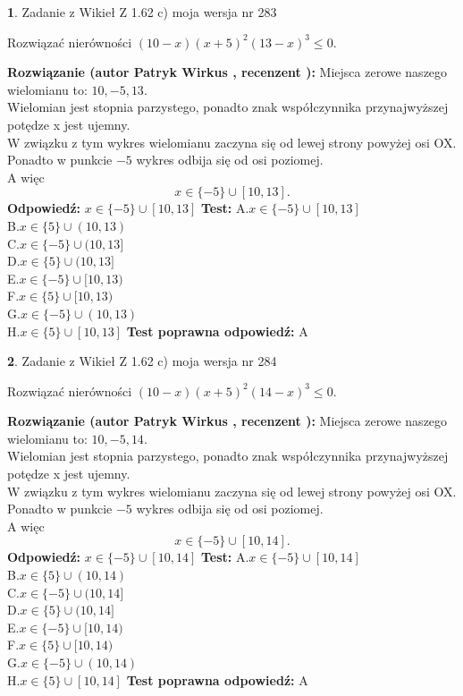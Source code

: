 \documentclass[12pt, a4paper]{article}
\theoremstyle{definition} %
\newtheorem{zad}{}
\newcommand{\zadStart}[1]{\begin{zad}#1\newline}
\newcommand{\zadStop}{\end{zad}}
\newcommand{\rozwStart}[2]{\noindent \textbf{Rozwiązanie (autor #1 , recenzent #2): }\newline}
\newcommand{\rozwStop}{\newline}
\newcommand{\odpStart}{\noindent \textbf{Odpowiedź:}\newline}
\newcommand{\odpStop}{\newline}
\newcommand{\testStart}{\noindent \textbf{Test:}\newline}
\newcommand{\testStop}{\newline}
\newcommand{\kluczStart}{\noindent \textbf{Test poprawna odpowiedź:}\newline}
\newcommand{\kluczStop}{\newline}
\begin{document}
\zadStart{Zadanie z Wikieł Z 1.62 c) moja wersja nr 283}

Rozwiązać nierówności $(10-x)(x+5)^{2}(13-x)^{3}\le0$.
\zadStop
\rozwStart{Patryk Wirkus}{}
Miejsca zerowe naszego wielomianu to: $10, -5, 13$.\\
Wielomian jest stopnia parzystego, ponadto znak współczynnika przy\linebreak najwyższej potędze x jest ujemny.\\ W związku z tym wykres wielomianu zaczyna się od lewej strony powyżej osi OX.\\
Ponadto w punkcie $-5$ wykres odbija się od osi poziomej.\\
A więc $$x \in \{-5\} \cup [10,13].$$
\rozwStop
\odpStart
$x \in \{-5\} \cup [10,13]$
\odpStop
\testStart
A.$x \in \{-5\} \cup [10,13]$\\
B.$x \in \{5\} \cup (10,13)$\\
C.$x \in \{-5\} \cup (10,13]$\\
D.$x \in \{5\} \cup (10,13]$\\
E.$x \in \{-5\} \cup [10,13)$\\
F.$x \in \{5\} \cup [10,13)$\\
G.$x \in \{-5\} \cup (10,13)$\\
H.$x \in \{5\} \cup [10,13]$
\testStop
\kluczStart
A
\kluczStop



\zadStart{Zadanie z Wikieł Z 1.62 c) moja wersja nr 284}

Rozwiązać nierówności $(10-x)(x+5)^{2}(14-x)^{3}\le0$.
\zadStop
\rozwStart{Patryk Wirkus}{}
Miejsca zerowe naszego wielomianu to: $10, -5, 14$.\\
Wielomian jest stopnia parzystego, ponadto znak współczynnika przy\linebreak najwyższej potędze x jest ujemny.\\ W związku z tym wykres wielomianu zaczyna się od lewej strony powyżej osi OX.\\
Ponadto w punkcie $-5$ wykres odbija się od osi poziomej.\\
A więc $$x \in \{-5\} \cup [10,14].$$
\rozwStop
\odpStart
$x \in \{-5\} \cup [10,14]$
\odpStop
\testStart
A.$x \in \{-5\} \cup [10,14]$\\
B.$x \in \{5\} \cup (10,14)$\\
C.$x \in \{-5\} \cup (10,14]$\\
D.$x \in \{5\} \cup (10,14]$\\
E.$x \in \{-5\} \cup [10,14)$\\
F.$x \in \{5\} \cup [10,14)$\\
G.$x \in \{-5\} \cup (10,14)$\\
H.$x \in \{5\} \cup [10,14]$
\testStop
\kluczStart
A
\kluczStop
\end{document}
